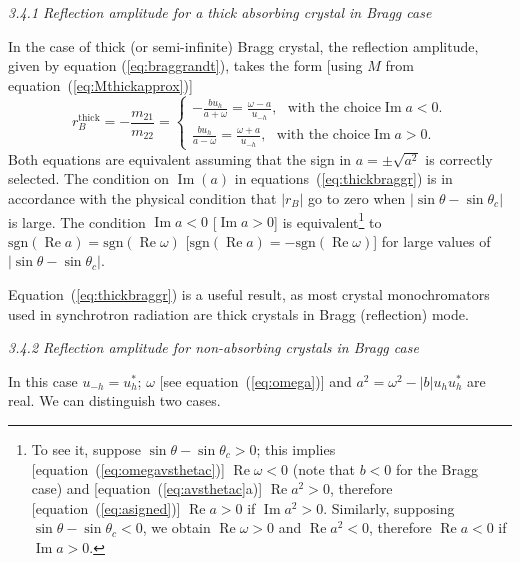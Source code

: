 \documentclass{iucr}
\begin{document}
\textit{3.4.1  Reflection amplitude for a thick absorbing crystal in Bragg case}

In the case of thick (or semi-infinite) Bragg crystal, the reflection amplitude, given by equation (\ref{eq:braggrandt}), takes the form [using $M$ from equation~(\ref{eq:Mthickapprox})]
\begin{equation}\label{eq:thickbraggr}
    r_B^{\text{thick}} = -\frac{m_{21}}{m_{22}} =
    \begin{cases} 
    -\frac{b u_h}{a+\omega}=\frac{\omega-a}{u_{-h}}, ~~~ \text{with the choice} \operatorname{Im} a <0.
    \\
    \frac{b u_h}{a-\omega} = \frac{\omega+a}{u_{-h}}, ~~~ \text{with the choice} \operatorname{Im} a>0.
    \end{cases}
\end{equation}
Both equations are equivalent assuming that the sign in $a=\pm \sqrt{a^2}$ is correctly selected. The condition on $\operatorname{Im}(a)$ in equations~(\ref{eq:thickbraggr}) is in accordance with the physical condition that $|r_B|$ go to zero when $|\sin\theta-\sin\theta_c|$ is large.
The condition $\operatorname{Im} a < 0$ [$\operatorname{Im} a > 0$] is equivalent\footnote{
To see it, suppose $\sin\theta-\sin\theta_c>0$; this implies [equation~(\ref{eq:omegavsthetac})] $\operatorname{Re}\omega<0$ (note that $b<0$ for the Bragg case) and 
[equation~(\ref{eq:avsthetac}a)] $\operatorname{Re}a^2>0$, therefore [equation~(\ref{eq:asigned})] $\operatorname{Re}a>0$ if $\operatorname{Im}a^2>0$. 
Similarly, supposing $\sin\theta-\sin\theta_c<0$, we obtain $\operatorname{Re}\omega>0$ and $\operatorname{Re}a^2<0$, therefore $\operatorname{Re}a<0$ if $\operatorname{Im}a>0$. 
}
to $\text{sgn}(\operatorname{Re}a)=\text{sgn}(\operatorname{Re}\omega)$ [$\text{sgn}(\operatorname{Re}a)=-\text{sgn}(\operatorname{Re}\omega)$] for large values of $|\sin\theta-\sin\theta_c|$.
 
Equation~(\ref{eq:thickbraggr}) is a useful result, as most crystal monochromators used in synchrotron radiation are thick crystals in Bragg (reflection) mode. 


\textit{3.4.2  Reflection amplitude for non-absorbing crystals in Bragg case}

In this case $u_{-h}=u^*_h$; $\omega$ [see equation~(\ref{eq:omega})] and $a^2=\omega^2-|b| u_h u_{h}^*$ are real. We can distinguish two cases. 
\end{document}
